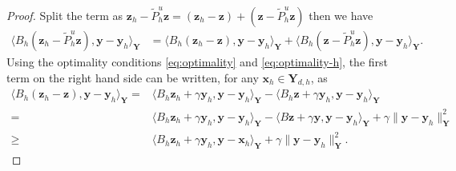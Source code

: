 \documentclass[10pt,a4paper]{amsart}
\newcommand\bPi{\boldsymbol{\Pi}}
\newcommand{\bY}{\boldsymbol{Y}}
\newcommand\bx{\boldsymbol{x}}
\newcommand\by{\boldsymbol{y}}
\newcommand\bz{\boldsymbol{z}}
\newcommand\cT{\mathcal{T}}
\newcommand{\tP}{\tilde{P}}
\begin{document}
\begin{proof}
	Split the term as $\bz_h - \tP_h^u \bz= (\bz_h - \bz) + (\bz- \tP_h^u \bz)$ then we have
	\begin{align*}
		\langle B_h (\bz_h - \tP_h^u \bz), \by - \by_h \rangle_{\bY}  & = \langle B_h (\bz_h - \bz), \by - \by_h \rangle_{\bY} + \langle B_h(\bz - \tP_h^u \bz), \by - \by_h \rangle_{\bY}.
	\end{align*}
	Using the optimality conditions \eqref{eq:optimality} and \eqref{eq:optimality-h}, the first term on the right hand side can be written, for any $\bx_h \in \bY_{d,h}$, as
	\begin{align*}
		\langle B_h (\bz_h - \bz), \by - \by_h \rangle_{\bY} = & \langle B_h \bz_h + \gamma \by_h, \by - \by_h \rangle_{\bY} - \langle B_h \bz + \gamma \by_h, \by - \by_h \rangle_{\bY} \\
		= & \langle B_h \bz_h + \gamma \by_h, \by - \by_h \rangle_{\bY} - \langle B \bz + \gamma \by, \by - \by_h \rangle_{\bY} + \gamma \|\by - \by_h \|_{\bY}^2 \\
		\ge  & \langle B_h \bz_h + \gamma \by_h, \by - \bx_h \rangle_{\bY}  + \gamma \|\by - \by_h\|_{\bY}^2.
	\end{align*}
\end{proof}
\end{document}
